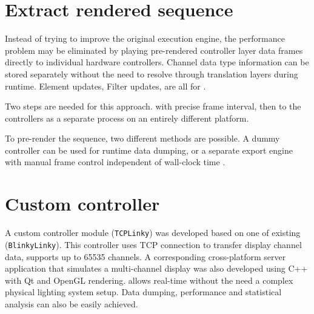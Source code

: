 \section{Extract rendered sequence}

Instead of trying to improve the original execution engine, the performance problem may be eliminated by playing pre-rendered controller layer data frames directly to individual hardware controllers. Channel data type information can be stored separately without the need to resolve through translation layers during runtime. Element updates, Filter updates,  are all  for .

Two steps are needed for this approach.  with precise frame interval, then  to the controllers as a separate process on an entirely different platform.

To pre-render the sequence, two different methods are possible. A dummy controller can be used for runtime data dumping, or a separate export engine with manual frame control independent of wall-clock time . 

\section{Custom controller}
\label{sec:tcplinky}

A custom controller module (\texttt{TCPLinky}) was developed based on one of  existing  (\texttt{BlinkyLinky}). This controller uses TCP connection to transfer display channel data,  supports up to 65535 channels. A corresponding cross-platform server application that simulates a multi-channel display was also developed using C++ with Qt \cite{qt} and OpenGL \cite{shreiner2009opengl} rendering.  allows real-time  without the need  a complex physical lighting system setup. Data dumping, performance and statistical analysis can also be easily achieved.

